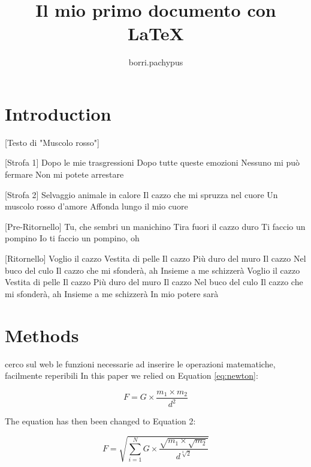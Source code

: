\documentclass[12pt]{article} %
\title{Il mio primo documento con LaTeX}
\author{borri.pachypus}
\begin{document}

\maketitle

\tableofcontents

\section{Introduction} \label{sec:intro}
[Testo di "Muscolo rosso"]

[Strofa 1]
Dopo le mie trasgressioni
Dopo tutte queste emozioni
Nessuno mi può fermare
Non mi potete arrestare

[Strofa 2]
Selvaggio animale in calore
Il cazzo che mi spruzza nel cuore
Un muscolo rosso d'amore
Affonda lungo il mio cuore

[Pre-Ritornello]
Tu, che sembri un manichino
Tira fuori il cazzo duro
Ti faccio un pompino
Io ti faccio un pompino, oh

[Ritornello]
Voglio il cazzo
Vestita di pelle
Il cazzo
Più duro del muro
Il cazzo
Nel buco del culo
Il cazzo che mi sfonderà, ah
Insieme a me schizzerà
Voglio il cazzo
Vestita di pelle
Il cazzo
Più duro del muro
Il cazzo
Nel buco del culo
Il cazzo che mi sfonderà, ah
Insieme a me schizzerà
In mio potere sarà

\section{Methods} 
cerco sul web le funzioni necessarie ad inserire le operazioni matematiche, facilmente reperibili
In this paper we relied on Equation \ref{eq:newton}:

\begin{equation}
F = G \times \frac{m_1 \times m_2}{d^2}
\label{eq:newton}
\end{equation}

The equation has then been changed to Equation 2:

\begin{equation}
F = \sqrt{\sum_{i=1}^{N} G \times \frac{\sqrt{m_1 \times \sqrt{m_2}}}{d^{\sqrt[3]{2}}}}
\end{equation}
\end{document}
